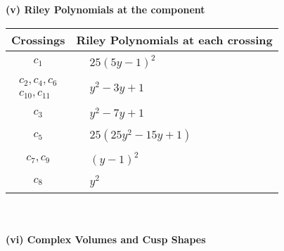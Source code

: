 \documentclass[1p]{elsarticle_modified}
\theoremstyle{definition}
\begin{document}
\newpage\renewcommand{\arraystretch}{1}
\flushleft \textbf{(v) Riley Polynomials at the component}\newline \\
\begin{tabular}{m{50pt}|m{274pt}}
Crossings & \hspace{64pt}Riley Polynomials at each crossing \\
\hline $$\begin{aligned}c_{1}\end{aligned}$$&$\begin{aligned}
&25(5 y-1)^2
\end{aligned}$\\
\hline $$\begin{aligned}c_{2},c_{4},c_{6}\\c_{10},c_{11}\end{aligned}$$&$\begin{aligned}
&y^2-3 y+1
\end{aligned}$\\
\hline $$\begin{aligned}c_{3}\end{aligned}$$&$\begin{aligned}
&y^2-7 y+1
\end{aligned}$\\
\hline $$\begin{aligned}c_{5}\end{aligned}$$&$\begin{aligned}
&25(25 y^2-15 y+1)
\end{aligned}$\\
\hline $$\begin{aligned}c_{7},c_{9}\end{aligned}$$&$\begin{aligned}
&(y-1)^2
\end{aligned}$\\
\hline $$\begin{aligned}c_{8}\end{aligned}$$&$\begin{aligned}
&y^2
\end{aligned}$\\
\hline
\end{tabular}\\~\\
\newpage\flushleft \textbf{(vi) Complex Volumes and Cusp Shapes}
\end{document}
